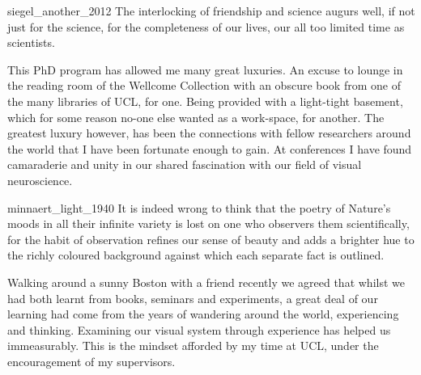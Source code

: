 \begin{acknowledgements}


\begin{citequote}{siegel_another_2012}
The interlocking of friendship and science augurs well, if not just for the science, for the completeness of our lives, our all too limited time as scientists.
\end{citequote}

This PhD program has allowed me many great luxuries. 
An excuse to lounge in the reading room of the Wellcome Collection with an obscure book from one of the many libraries of \gls{UCL}, for one. 
Being provided with a light-tight basement, which for some reason no-one else wanted as a work-space, for another.
The greatest luxury however, has been the connections with fellow researchers around the world that I have been fortunate enough to gain. At conferences I have found camaraderie and unity in our shared fascination with our field of visual neuroscience.
\bigskip

\begin{citequote}{minnaert_light_1940}
It is indeed wrong to think that the poetry of Nature's moods in all their infinite variety is lost on one who observers them scientifically, for the habit of observation refines our sense of beauty and adds a brighter hue to the richly coloured background against which each separate fact is outlined.
\end{citequote}

Walking around a sunny Boston with a friend recently we agreed that whilst we had both learnt from books, seminars and experiments, a great deal of our learning had come from the years of wandering around the world, experiencing and thinking. Examining our visual system through experience has helped us immeasurably. This is the mindset afforded by my time at \gls{UCL}, under the encouragement of my supervisors.


\end{acknowledgements}
